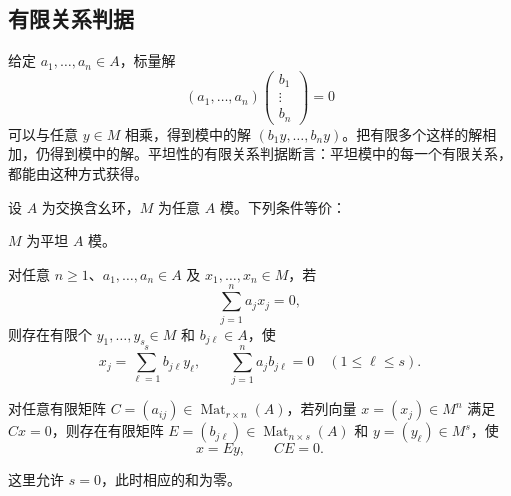\subsection{有限关系判据}
\label{g5:subsec:0601:02}

给定 \(a_1,\ldots,a_n\in A\)，标量解
\[
	(a_1,\ldots,a_n)
	\begin{pmatrix}b_1\\ \vdots\\ b_n\end{pmatrix}=0
\]
可以与任意 \(y\in M\) 相乘，得到模中的解 \((b_1y,\ldots,b_ny)\)。把有限多个这样的解相加，仍得到模中的解。平坦性的有限关系判据断言：平坦模中的每一个有限关系，都能由这种方式获得。

\begin{theorem}\label{g5:thm:flat-equational-criterion}
	设 \(A\) 为交换含幺环，\(M\) 为任意 \(A\) 模。下列条件等价：
	\begin{equivalences}
		\item \(M\) 为平坦 \(A\) 模。
		\item 对任意 \(n\geq1\)、\(a_1,\ldots,a_n\in A\) 及 \(x_1,\ldots,x_n\in M\)，若
		\[
			\sum_{j=1}^n a_jx_j=0,
		\]
		则存在有限个 \(y_1,\ldots,y_s\in M\) 和 \(b_{j\ell}\in A\)，使
		\[
			x_j=\sum_{\ell=1}^s b_{j\ell}y_\ell,\qquad
			\sum_{j=1}^n a_jb_{j\ell}=0
			\quad(1\leq\ell\leq s).
		\]
		\item 对任意有限矩阵 \(C=(a_{ij})\in\operatorname{Mat}_{r\times n}(A)\)，若列向量 \(x=(x_j)\in M^n\) 满足 \(Cx=0\)，则存在有限矩阵 \(E=(b_{j\ell})\in\operatorname{Mat}_{n\times s}(A)\) 和 \(y=(y_\ell)\in M^s\)，使
		\begin{equation}\label{g5:eq:flat-relation-factorization}
			x=Ey,\qquad CE=0.
		\end{equation}
	\end{equivalences}
	这里允许 \(s=0\)，此时相应的和为零。
\end{theorem}
